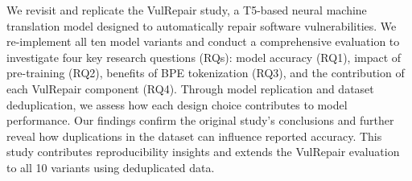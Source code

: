 We revisit and replicate the VulRepair study, a T5-based neural machine translation model designed to automatically repair software vulnerabilities. We re-implement all ten model variants and conduct a comprehensive evaluation to investigate four key research questions (RQs): model accuracy (RQ1), impact of pre-training (RQ2), benefits of BPE tokenization (RQ3), and the contribution of each VulRepair component (RQ4). Through model replication and dataset deduplication, we assess how each design choice contributes to model performance. Our findings confirm the original study's conclusions and further reveal how duplications in the dataset can influence reported accuracy. This study contributes reproducibility insights and extends the VulRepair evaluation to all 10 variants using deduplicated data.